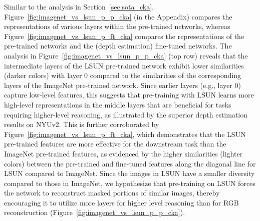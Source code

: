Similar to the analysis in Section~\ref{sec:sota_cka}, Figure~\ref{fig:imagenet_vs_lsun_p_p_cka} (in the Appendix) compares the representations of various layers within the pre-trained networks, whereas Figure~\ref{fig:imagenet_vs_lsun_p_ft_cka} compares the representations of the pre-trained networks and the (depth estimation) fine-tuned networks. The analysis in Figure~\ref{fig:imagenet_vs_lsun_p_p_cka} (top row) reveals that the intermediate layers of the LSUN pre-trained network exhibit lower similarities (darker colors) with layer 0 compared to the similarities of the corresponding layers of the ImageNet pre-trained network. Since earlier layers (e.g., layer 0) capture low-level features, this suggests that pre-training with LSUN learns more high-level representations in the middle layers that are beneficial for tasks requiring higher-level reasoning, as illustrated by the superior depth estimation results on NYUv2. This is further corroborated by Figure~\ref{fig:imagenet_vs_lsun_p_ft_cka}, which demonstrates that the LSUN pre-trained features are more effective for the downstream task than the ImageNet pre-trained features, as evidenced by the higher similarities (lighter colors) between the pre-trained and fine-tuned features along the diagonal line for LSUN compared to ImageNet. Since the images in LSUN have a smaller diversity compared to those in ImageNet, we hypothesize that pre-training on LSUN forces the network to reconstruct masked portions of similar images, thereby encouraging it to utilize more layers for higher level reasoning than for RGB reconstruction (Figure~\ref{fig:imagenet_vs_lsun_p_p_cka}).
